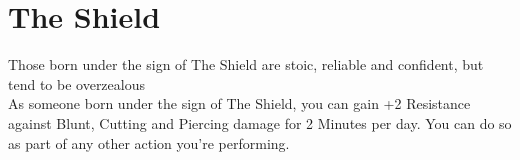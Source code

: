 \section{The Shield}\label{zodiac:shield}

Those born under the sign of The Shield are stoic, reliable and confident, but tend to be overzealous\\
As someone born under the sign of The Shield, you can gain +2 Resistance against Blunt, Cutting and Piercing damage for 2 Minutes per day.
You can do so as part of any other action you're performing.\\